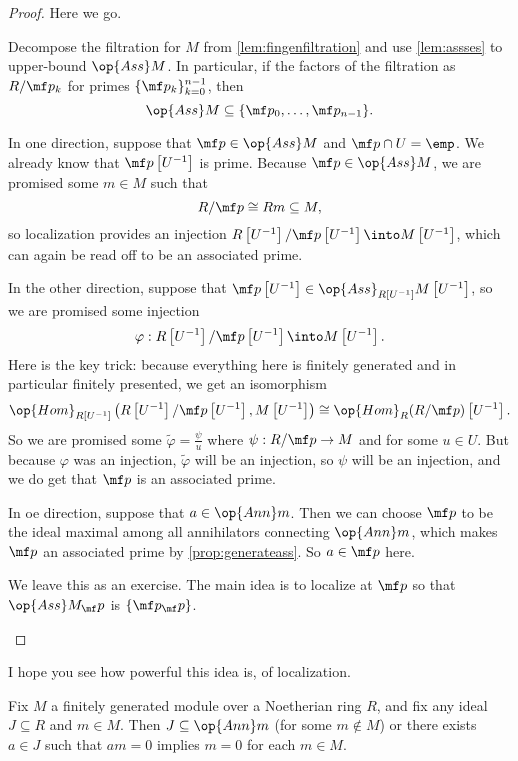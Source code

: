 \begin{proof}
	Here we go.
	\begin{listalph}
		\item Decompose the filtration for $M$ from \autoref{lem:fingenfiltration} and use \autoref{lem:assses} to upper-bound $\op{Ass}M$. In particular, if the factors of the filtration as $R/\mf p_k$ for primes $\{\mf p_k\}_{k=0}^{n-1}$, then
		\[\op{Ass}M\subseteq\{\mf p_0,\ldots,\mf p_{n-1}\}.\]
		\item In one direction, suppose that $\mf p\in\op{Ass}M$ and $\mf p\cap U=\emp$. We already know that $\mf p\left[U^{-1}\right]$ is prime. Because $\mf p\in\op{Ass}M$, we are promised some $m\in M$ such that
		\[R/\mf p\cong Rm\subseteq M,\]
		so localization provides an injection $R\left[U^{-1}\right]/\mf p\left[U^{-1}\right]\into M\left[U^{-1}\right]$, which can again be read off to be an associated prime. %

		In the other direction, suppose that $\mf p\left[U^{-1}\right]\in\op{Ass}_{R\left[U^{-1}\right]}M\left[U^{-1}\right]$, so we are promised some injection
		\[\varphi:R\left[U^{-1}\right]/\mf p\left[U^{-1}\right]\into M\left[U^{-1}\right].\]
		Here is the key trick: because everything here is finitely generated and in particular finitely presented, we get an isomorphism
		\[\op{Hom}_{R\left[U^{-1}\right]}\left(R\left[U^{-1}\right]/\mf p\left[U^{-1}\right],M\left[U^{-1}\right]\right)\cong\op{Hom}_R(R/\mf p)\left[U^{-1}\right].\]
		So we are promised some $\widetilde\varphi=\frac\psi u$ where $\psi:R/\mf p\to M$ and for some $u\in U$. But because $\varphi$ was an injection, $\widetilde\varphi$ will be an injection, so $\psi$ will be an injection, and we do get that $\mf p$ is an associated prime.
		\item In oe direction, suppose that $a\in\op{Ann}m$. Then we can choose $\mf p$ to be the ideal maximal among all annihilators connecting $\op{Ann}m$, which makes $\mf p$ an associated prime by \autoref{prop:generateass}. So $a\in\mf p$ here.
		\item We leave this as an exercise. The main idea is to localize at $\mf p$ so that $\op{Ass}M_\mf p$ is $\{\mf p_\mf p\}$.
		\qedhere
	\end{listalph}
\end{proof}
\begin{quot}
	I hope you see how powerful this idea is, of localization.
\end{quot}
\begin{corollary}
	Fix $M$ a finitely generated module over a Noetherian ring $R$, and fix any ideal $J\subseteq R$ and $m\in M$. Then $J\subseteq\op{Ann}m$ (for some $m\notin M$) or there exists $a\in J$ such that $am=0$ implies $m=0$ for each $m\in M$.
\end{corollary}
